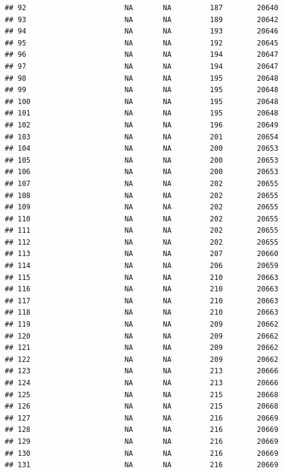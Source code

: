 \documentclass[
]{article}
\begin{document}
\begin{verbatim}
## 92                       NA       NA         187        20640
## 93                       NA       NA         189        20642
## 94                       NA       NA         193        20646
## 95                       NA       NA         192        20645
## 96                       NA       NA         194        20647
## 97                       NA       NA         194        20647
## 98                       NA       NA         195        20648
## 99                       NA       NA         195        20648
## 100                      NA       NA         195        20648
## 101                      NA       NA         195        20648
## 102                      NA       NA         196        20649
## 103                      NA       NA         201        20654
## 104                      NA       NA         200        20653
## 105                      NA       NA         200        20653
## 106                      NA       NA         200        20653
## 107                      NA       NA         202        20655
## 108                      NA       NA         202        20655
## 109                      NA       NA         202        20655
## 110                      NA       NA         202        20655
## 111                      NA       NA         202        20655
## 112                      NA       NA         202        20655
## 113                      NA       NA         207        20660
## 114                      NA       NA         206        20659
## 115                      NA       NA         210        20663
## 116                      NA       NA         210        20663
## 117                      NA       NA         210        20663
## 118                      NA       NA         210        20663
## 119                      NA       NA         209        20662
## 120                      NA       NA         209        20662
## 121                      NA       NA         209        20662
## 122                      NA       NA         209        20662
## 123                      NA       NA         213        20666
## 124                      NA       NA         213        20666
## 125                      NA       NA         215        20668
## 126                      NA       NA         215        20668
## 127                      NA       NA         216        20669
## 128                      NA       NA         216        20669
## 129                      NA       NA         216        20669
## 130                      NA       NA         216        20669
## 131                      NA       NA         216        20669

\end{verbatim}
\end{document}
